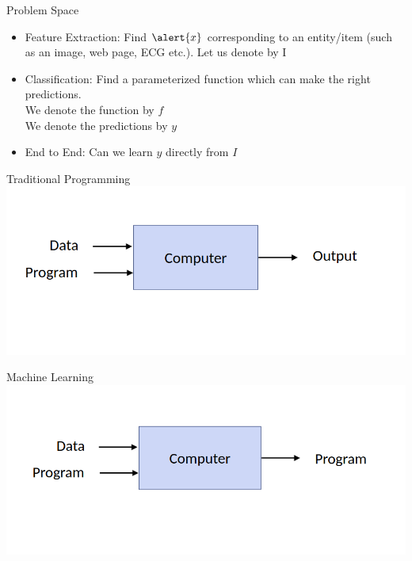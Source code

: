 \documentclass[aspectratio=169,14pt]{beamer}
\begin{document}
\begin{frame}{Problem Space}
\begin{itemize}
	\item<2-> \alert{Feature Extraction:} Find $\alert{x}$ corresponding to an  entity/item (such as an image, web page, ECG  etc.). Let us denote by \alert{I}
	\item<3-> \alert{Classification}: Find a parameterized function which can make the right predictions. \\ We denote the function by \alert{\textit{$f$}} \\ We denote the predictions by \alert{\textit{$y$}}

\item<4-> \alert{End to End:} Can we learn \alert{$y$} directly from \alert{$I$}

\end{itemize}
\end{frame}

\begin{frame}{Traditional Programming}
\includegraphics[width=\textwidth,height=0.65\textheight]{Images/demystifying_TP.png}
\end{frame}

\begin{frame}{Machine Learning}
\includegraphics[width=\textwidth,height=0.65\textheight]{Images/demystifying_ML.png}
\end{frame}
\end{document}
